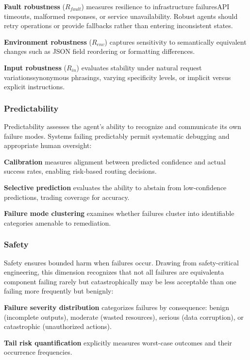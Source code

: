\textbf{Fault robustness} ($R_{fault}$) measures resilience to infrastructure failuresAPI timeouts, malformed responses, or service unavailability. Robust agents should retry operations or provide fallbacks rather than entering inconsistent states.

\textbf{Environment robustness} ($R_{env}$) captures sensitivity to semantically equivalent changes such as JSON field reordering or formatting differences.

\textbf{Input robustness} ($R_{in}$) evaluates stability under natural request variationssynonymous phrasings, varying specificity levels, or implicit versus explicit instructions.

\subsubsection{Predictability}

Predictability assesses the agent's ability to recognize and communicate its own failure modes. Systems failing predictably permit systematic debugging and appropriate human oversight:

\textbf{Calibration} measures alignment between predicted confidence and actual success rates, enabling risk-based routing decisions.

\textbf{Selective prediction} evaluates the ability to abstain from low-confidence predictions, trading coverage for accuracy.

\textbf{Failure mode clustering} examines whether failures cluster into identifiable categories amenable to remediation.

\subsubsection{Safety}

Safety ensures bounded harm when failures occur. Drawing from safety-critical engineering, this dimension recognizes that not all failures are equivalenta component failing rarely but catastrophically may be less acceptable than one failing more frequently but benignly:

\textbf{Failure severity distribution} categorizes failures by consequence: benign (incomplete outputs), moderate (wasted resources), serious (data corruption), or catastrophic (unauthorized actions).

\textbf{Tail risk quantification} explicitly measures worst-case outcomes and their occurrence frequencies.

